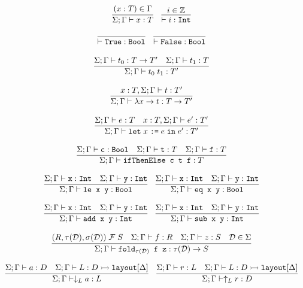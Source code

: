 \documentclass[10pt]{article}
\begin{document}
\[
  \begin{array}{c}
    \infer{\Sigma ; \Gamma \vdash x : T}{(x : T) \in \Gamma}
    ~~~
    \infer{\vdash i : \ttt{Int}}{i \in \mathbb{Z}}
    \\\\
    \infer{\vdash \ttt{True} : \ttt{Bool}}{}
    ~~~
    \infer{\vdash \ttt{False} : \ttt{Bool}}{}
    \\\\
    \infer{\Sigma ; \Gamma \vdash t_0\; t_1 : T'}{\Sigma ; \Gamma \vdash t_0 : T \ra T' & \Sigma ; \Gamma \vdash t_1 : T}
    \\\\
    \infer{\Sigma ; \Gamma \vdash \lambda x \ra t : T \ra T'}{x : T, \Sigma ; \Gamma \vdash t : T'}
    \\\\
    \infer{\Sigma ; \Gamma \vdash \letbnd\; x\; \ttt{:=}\; e\; \inexpr\; e' : T'}{\Sigma ; \Gamma \vdash e : T & x : T, \Sigma ; \Gamma \vdash e' : T'}
    \\\\
    \infer{\Sigma ; \Gamma \vdash \ttt{ifThenElse c t f} : T}{\Sigma ; \Gamma \vdash \ttt{c} : \Bool & \Sigma ; \Gamma \vdash \ttt{t} : T & \Sigma ; \Gamma \vdash \ttt{f} : T}
    \\\\
    \infer{\Sigma ; \Gamma \vdash \ttt{le x y} : \Bool}{\Sigma ; \Gamma \vdash \ttt{x} : \Int & \Sigma ; \Gamma \vdash \ttt{y} : \Int}
    ~~~
    \infer{\Sigma ; \Gamma \vdash \ttt{eq x y} : \Bool}{\Sigma ; \Gamma \vdash \ttt{x} : \Int & \Sigma ; \Gamma \vdash \ttt{y} : \Int}
    \\\\
    \infer{\Sigma ; \Gamma \vdash \ttt{add x y} : \Int}{\Sigma ; \Gamma \vdash \ttt{x} : \Int & \Sigma ; \Gamma \vdash \ttt{y} : \Int}
    ~~~
    \infer{\Sigma ; \Gamma \vdash \ttt{sub x y} : \Int}{\Sigma ; \Gamma \vdash \ttt{x} : \Int & \Sigma ; \Gamma \vdash \ttt{y} : \Int}
    \\\\
    \infer{\Sigma ; \Gamma \vdash \ttt{fold}_{\tau(\mathcal{D})} \ttt{ f z} : \tau(\mathcal{D}) \ra S}{(R,\tau(\mathcal{D}),\sigma(\mathcal{D}))\; \mathcal{F}\; S & \Sigma ; \Gamma \vdash f : R & \Sigma ; \Gamma \vdash z : S & \mathcal{D} \in \Sigma}
    \\\\
    \infer{\Sigma ; \Gamma \vdash \downarrow_L a : L}{\Sigma ; \Gamma \vdash a : D & \Sigma ; \Gamma \vdash L : D \hra \ttt{layout}[\Delta]}
    ~~~
    \infer{\Sigma ; \Gamma \vdash \uparrow_L r : D}{\Sigma ; \Gamma \vdash r : L & \Sigma ; \Gamma \vdash L : D \hra \ttt{layout}[\Delta]}

\end{array}\]
\end{document}

